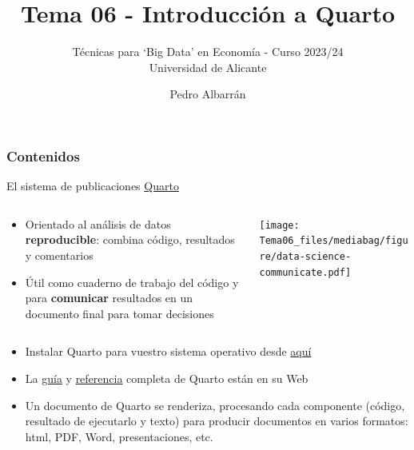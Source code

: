 \documentclass[
  10pt,
  ignorenonframetext,
]{beamer}
\title{Tema 06 - Introducción a Quarto}
\subtitle{Técnicas para `Big Data' en Economía - Curso 2023/24\\
Universidad de Alicante}
\author{Pedro Albarrán}
\date{}
\institute{Dpto. de Fundamentos del Análisis Económico. Universidad de
Alicante}
\renewcommand*\contentsname{Tabla de contenidos}
\newcommand\contentsname{Tabla de contenidos}
\begin{document}
\frame{\titlepage}

\renewcommand*\contentsname{Contenidos}
\begin{frame}[allowframebreaks]
  \frametitle{Contenidos}
  \tableofcontents[hideallsubsections]
\end{frame}
\begin{frame}{El sistema de publicaciones
\href{https://quarto.org/}{Quarto}}
\label{el-sistema-de-publicaciones-quarto}
\begin{columns}[T]
\begin{column}{0.5\textwidth}
\begin{itemize}
\item
  Orientado al análisis de datos \textbf{reproducible}: combina código,
  resultados y comentarios
\item
  Útil como cuaderno de trabajo del código y para \textbf{comunicar}
  resultados en un documento final para tomar decisiones
\end{itemize}
\end{column}

\begin{column}{0.5\textwidth}
\texttt{[image: Tema06\_files/mediabag/figure/data-science-communicate.pdf]}
\end{column}
\end{columns}

\begin{itemize}
\item
  Instalar Quarto para vuestro sistema operativo desde
  \href{https://quarto.org/docs/get-started/}{aquí}
\item
  La \href{https://quarto.org/docs/guide/}{guía} y
  \href{https://quarto.org/docs/reference/}{referencia} completa de
  Quarto están en su Web
\item
  Un documento de Quarto se renderiza, procesando cada componente
  (código, resultado de ejecutarlo y texto) para producir documentos en
  varios formatos: html, PDF, Word, presentaciones, etc.
\end{itemize}
\end{frame}
\end{document}
